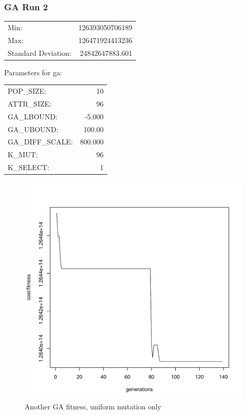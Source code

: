 \pagebreak
\subsubsection{GA Run 2}
\begin{tabular}{lr}
	Min: 			& 126393050706189   \\
	Max:			& 126471924413236   \\
	Standard Deviation:	& 24842647883.601  \\
\end{tabular}


Parameters for ga:\\
\begin{tabular}{lr}
	POP\_SIZE:	& 10 \\
	ATTR\_SIZE:	& 96 \\
	GA\_LBOUND:	& -5.000 \\
	GA\_UBOUND:	& 100.00 \\
	GA\_DIFF\_SCALE: & 800.000 \\
	K\_MUT:		& 96 \\
	K\_SELECT:	& 1 \\
\end{tabular}

\begin{figure}[!h]
	\begin{center}
		\includegraphics[width=120mm]{output/ga02/graph.pdf}
               	\caption{Another GA fitness, uniform mutation only}
                \label{saXX_exc}
        \end{center}
\end{figure}

